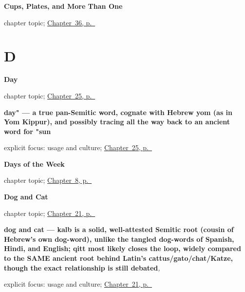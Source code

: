 \noindent\begin{minipage}[t]{\linewidth}
\raggedright
\textbf{Cups, Plates, and More Than One}\par
\footnotesize chapter topic; \hyperref[ch:ar-cups-plates-and-more-than-one]{Chapter~36, p.~\pageref*{ch:ar-cups-plates-and-more-than-one}}
\end{minipage}\par\smallskip

\section*{D}

\noindent\begin{minipage}[t]{\linewidth}
\raggedright
\textbf{Day}\par
\footnotesize chapter topic; \hyperref[ch:ar-day]{Chapter~25, p.~\pageref*{ch:ar-day}}
\end{minipage}\par\smallskip

\noindent\begin{minipage}[t]{\linewidth}
\raggedright
\textbf{day" — a true pan-Semitic word, cognate with Hebrew yom (as in Yom Kippur), and possibly tracing all the way back to an ancient word for "sun}\enspace\emph{}\par
\footnotesize explicit focus: usage and culture; \hyperref[ch:ar-day]{Chapter~25, p.~\pageref*{ch:ar-day}}
\end{minipage}\par\smallskip

\noindent\begin{minipage}[t]{\linewidth}
\raggedright
\textbf{Days of the Week}\par
\footnotesize chapter topic; \hyperref[ch:ar-days-of-the-week]{Chapter~8, p.~\pageref*{ch:ar-days-of-the-week}}
\end{minipage}\par\smallskip

\noindent\begin{minipage}[t]{\linewidth}
\raggedright
\textbf{Dog and Cat}\par
\footnotesize chapter topic; \hyperref[ch:ar-dog-and-cat]{Chapter~21, p.~\pageref*{ch:ar-dog-and-cat}}
\end{minipage}\par\smallskip

\noindent\begin{minipage}[t]{\linewidth}
\raggedright
\textbf{dog and cat — kalb is a solid, well-attested Semitic root (cousin of Hebrew's own dog-word), unlike the tangled dog-words of Spanish, Hindi, and English; qitt most likely closes the loop, widely compared to the SAME ancient root behind Latin's cattus/gato/chat/Katze, though the exact relationship is still debated}\enspace\emph{, }\par
\footnotesize explicit focus: usage and culture; \hyperref[ch:ar-dog-and-cat]{Chapter~21, p.~\pageref*{ch:ar-dog-and-cat}}
\end{minipage}\par\smallskip

